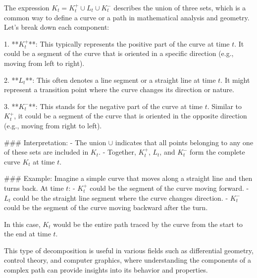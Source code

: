 The expression \( K_t = K^+_t \cup L_t \cup K^-_t \) describes the union of three sets, which is a common way to define a curve or a path in mathematical analysis and geometry. Let's break down each component:

1. **\( K^+_t \)**: This typically represents the positive part of the curve at time \( t \). It could be a segment of the curve that is oriented in a specific direction (e.g., moving from left to right).

2. **\( L_t \)**: This often denotes a line segment or a straight line at time \( t \). It might represent a transition point where the curve changes its direction or nature.

3. **\( K^-_t \)**: This stands for the negative part of the curve at time \( t \). Similar to \( K^+_t \), it could be a segment of the curve that is oriented in the opposite direction (e.g., moving from right to left).

### Interpretation:
- The union \( \cup \) indicates that all points belonging to any one of these sets are included in \( K_t \).
- Together, \( K^+_t \), \( L_t \), and \( K^-_t \) form the complete curve \( K_t \) at time \( t \).

### Example:
Imagine a simple curve that moves along a straight line and then turns back. At time \( t \):
- \( K^+_t \) could be the segment of the curve moving forward.
- \( L_t \) could be the straight line segment where the curve changes direction.
- \( K^-_t \) could be the segment of the curve moving backward after the turn.

In this case, \( K_t \) would be the entire path traced by the curve from the start to the end at time \( t \).

This type of decomposition is useful in various fields such as differential geometry, control theory, and computer graphics, where understanding the components of a complex path can provide insights into its behavior and properties.